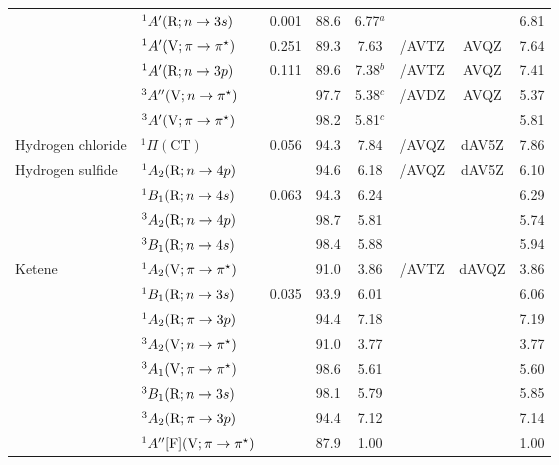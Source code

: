 \begin{tabular}{llcccccc}
                        &$^1A^\prime (\mathrm{R};n \rightarrow 3s)$							&0.001	&88.6 &6.77$^a$	&			&			&6.81	\\
                        &$^1A^\prime (\mathrm{V};\pi \rightarrow \pi^\star)$					&0.251	&89.3 &7.63		&{\exCI}/AVTZ & AVQZ		&7.64	\\
                        &$^1A^\prime (\mathrm{R};n \rightarrow 3p)$							&0.111	&89.6 &7.38$^b$	&{\CCSDT}/AVTZ& AVQZ		&7.41	\\
                        &$^3A^{\prime\prime} (\mathrm{V};n \rightarrow \pi^\star)$					&		&97.7 &5.38$^c$	&{\exCI}/AVDZ& AVQZ		&5.37	\\
                        &$^3A^\prime (\mathrm{V};\pi \rightarrow \pi^\star)$					&		&98.2 &5.81$^c$	&			&			&5.81	\\
      Hydrogen chloride	 & $^1\Pi (\mathrm{CT})$							&0.056	&94.3 &7.84		& {\exCI}/AVQZ &dAV5Z		&7.86	\\	
      Hydrogen sulfide &$^1A_2 (\mathrm{R};n \rightarrow 4p)$ 						&		&94.6 &6.18		& {\exCI}/AVQZ &dAV5Z		&6.10	\\
                        &$^1B_1 (\mathrm{R};n \rightarrow 4s)$ 						& 0.063	&94.3 &6.24		&  			&			&6.29	\\
                        &$^3A_2 (\mathrm{R};n \rightarrow 4p)$ 						&		&98.7 &5.81		&  			&			&5.74	\\
                        &$^3B_1 (\mathrm{R};n \rightarrow 4s)$ 						&		&98.4 &5.88		& 			&			&5.94	 \\
      Ketene		&$^1A_2 (\mathrm{V};\pi \rightarrow \pi^\star)$ 				&		&91.0 &3.86		&{\exCI}/AVTZ & dAVQZ		&3.86	\\
                        &$^1B_1 (\mathrm{R};n \rightarrow 3s)$ 						& 0.035	&93.9 &6.01		&			&			&6.06	\\
                        &$^1A_2 (\mathrm{R};\pi \rightarrow 3p)$ 						&		&94.4 &7.18		&			&			&7.19	\\
                        &$^3A_2 (\mathrm{V};n \rightarrow \pi^\star)$ 					&		&91.0 &3.77		&			&			&3.77	\\
                        &$^3A_1 (\mathrm{V};\pi \rightarrow \pi^\star)$ 				&		&98.6 &5.61		&			&			&5.60	\\
                        &$^3B_1 (\mathrm{R};n \rightarrow 3s)$ 						&		&98.1 &5.79		&			&			&5.85	\\
                        &$^3A_2 (\mathrm{R};\pi \rightarrow 3p)$ 						&		&94.4 &7.12		&			&			&7.14	\\
                        &$^1A^{\prime\prime} [\mathrm{F}] (\mathrm{V};\pi \rightarrow \pi^\star)$		&		&87.9 &1.00		&			 & 			&1.00	\\

\end{tabular}

